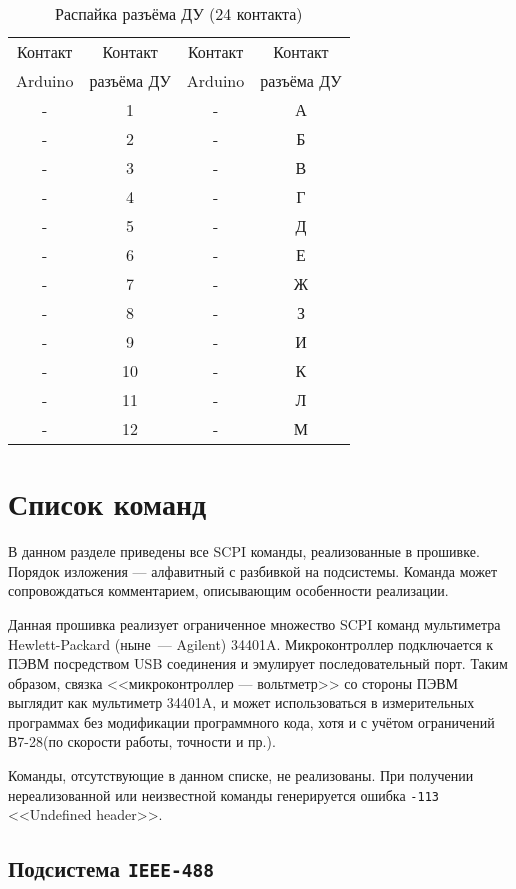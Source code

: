 \documentclass[10pt, a4paper, twocolumn]{article}
\newcommand{\SCPI}{\mbox{SCPI}}
\newcommand{\V}{\mbox{В7-28}}
\newcommand{\CMD}[1]{{\tt #1}}
\newcommand{\SUBSYSTEMSECTION}[1]{\subsection{Подсистема \CMD{#1}}}
\begin{document}
\begin{table*}
\begin{center}
\caption{Распайка разъёма ДУ (24 контакта)}
\begin{tabular}{cccc}
\hline \hline
Контакт & Контакт & Контакт & Контакт \\
Arduino & разъёма ДУ & Arduino & разъёма ДУ \\
\hline
- & 1 & - & А \\
- & 2 & - & Б \\
- & 3 & - & В \\
- & 4 & - & Г \\
- & 5 & - & Д \\
- & 6 & - & Е \\
- & 7 & - & Ж \\
- & 8 & - & З \\
- & 9 & - & И \\
- & 10 & - & К \\
- & 11 & - & Л \\
- & 12 & - & М \\
\hline \hline
\end{tabular}
\label{tab_rc_wires}
\end{center}
\end{table*}

\section{Список команд}

В данном разделе приведены все \SCPI{} команды, реализованные в прошивке. Порядок изложения --- алфавитный с разбивкой на подсистемы. Команда может сопровождаться комментарием, описывающим особенности реализации.

Данная прошивка реализует ограниченное множество \SCPI{} команд мультиметра Hewlett-Packard (ныне~--- Agilent) \mbox{34401A}. Микроконтроллер подключается к ПЭВМ посредством USB соединения и эмулирует последовательный порт. Таким образом, связка <<микроконтроллер --- вольтметр>> со стороны ПЭВМ выглядит как мультиметр \mbox{34401A}, и может использоваться в измерительных программах без модификации программного кода, хотя и с учётом ограничений \V (по скорости работы, точности и пр.).

Команды, отсутствующие в данном списке, не реализованы. При получении нереализованной или неизвестной команды генерируется ошибка \CMD{-113} <<Undefined header>>.

\SUBSYSTEMSECTION{IEEE-488}
\end{document}
